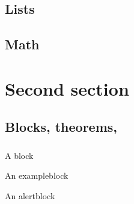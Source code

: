 \documentclass[%
]{phdpresentation}
\begin{document}
\subsection{Lists}
\begin{frame}
	\frametitle{\secname}
	\framesubtitle{\subsecname}
	\begin{twocolumns}
		\begin{onecolumn}
			\blinditemize
		\end{onecolumn}
		\begin{onecolumn}
			\blindenumerate
		\end{onecolumn}
	\end{twocolumns}
\end{frame}

\begin{frame}
	\frametitle{\secname}
	\framesubtitle{\subsecname}
	\begin{twocolumns}
		\begin{onecolumn}
			\blinddescription
		\end{onecolumn}
		\begin{onecolumn}
			\blindtextshort
		\end{onecolumn}
	\end{twocolumns}
\end{frame}

\subsection{Math}
\begin{frame}
	\frametitle{\secname}
	\framesubtitle{\subsecname}
	\blindmathformula[0]
	\blindmathformula[1]
	\blindmathformula[2]
\end{frame}




\section{Second section}
\subsection{Blocks, theorems, \textellipsis}
\begin{frame}
	\frametitle{\secname}
	\framesubtitle{\subsecname}
	\begin{block}{A block}
		\blindtextshortshort
		\blindenumerate[1]
	\end{block}
	\begin{exampleblock}{An exampleblock}
		\blindtextshortshort
		\blindenumerate[1]
	\end{exampleblock}
	\begin{alertblock}{An alertblock}
		\blindtextshortshort
		\blindenumerate[1]
	\end{alertblock}
\end{frame}
\end{document}
